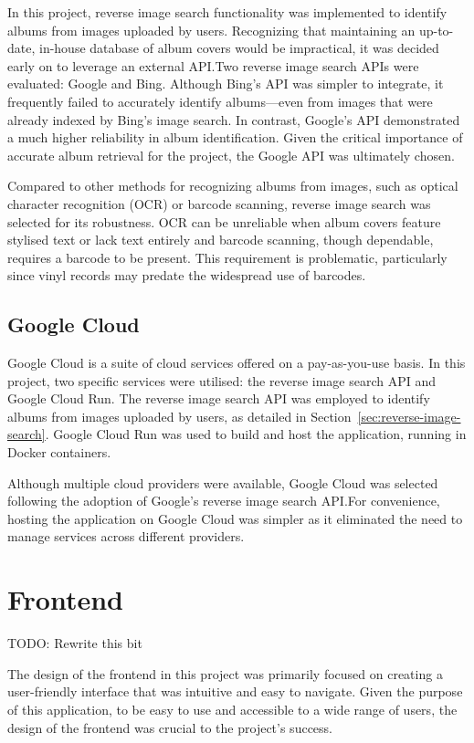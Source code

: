 In this project, reverse image search functionality was implemented to identify albums from images uploaded by users. Recognizing that maintaining an up-to-date, in-house database of album covers would be impractical, it was decided early on to leverage an external API.\@ Two reverse image search APIs were evaluated: Google and Bing. Although Bing's API was simpler to integrate, it frequently failed to accurately identify albums—even from images that were already indexed by Bing's image search. In contrast, Google's API demonstrated a much higher reliability in album identification. Given the critical importance of accurate album retrieval for the project, the Google API was ultimately chosen.

Compared to other methods for recognizing albums from images, such as optical character recognition (OCR) or barcode scanning, reverse image search was selected for its robustness. OCR can be unreliable when album covers feature stylised text or lack text entirely and barcode scanning, though dependable, requires a barcode to be present. This requirement is problematic, particularly since vinyl records may predate the widespread use of barcodes.

\subsection{Google Cloud}
Google Cloud is a suite of cloud services offered on a pay-as-you-use basis. In this project, two specific services were utilised: the reverse image search API and Google Cloud Run. The reverse image search API was employed to identify albums from images uploaded by users, as detailed in Section~\ref{sec:reverse-image-search}. Google Cloud Run was used to build and host the application, running in Docker containers.

Although multiple cloud providers were available, Google Cloud was selected following the adoption of Google's reverse image search API.\@ For convenience, hosting the application on Google Cloud was simpler as it eliminated the need to manage services across different providers.

\section{Frontend}
TODO: Rewrite this bit

The design of the frontend in this project was primarily focused on creating a user-friendly interface that was intuitive and easy to navigate. Given the purpose of this application, to be easy to use and accessible to a wide range of users, the design of the frontend was crucial to the project's success.


